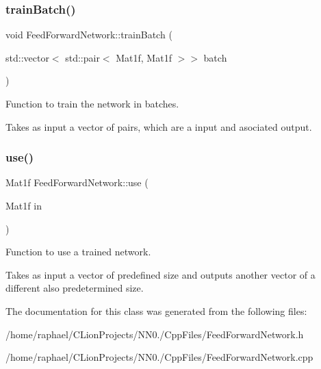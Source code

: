 \subsubsection{\texorpdfstring{train\+Batch()}{trainBatch()}}
{\footnotesize\ttfamily void Feed\+Forward\+Network\+::train\+Batch (\begin{DoxyParamCaption}\item[{std\+::vector$<$ std\+::pair$<$ Mat1f, Mat1f $>$$>$}]{batch }\end{DoxyParamCaption})}



Function to train the network in batches. 

Takes as input a vector of pairs, which are a input and asociated output. \mbox{\label{classFeedForwardNetwork_a17eb3563391ca5aecdff73d538e33f91}} 
\subsubsection{\texorpdfstring{use()}{use()}}
{\footnotesize\ttfamily Mat1f Feed\+Forward\+Network\+::use (\begin{DoxyParamCaption}\item[{Mat1f}]{in }\end{DoxyParamCaption})}



Function to use a trained network. 

Takes as input a vector of predefined size and outputs another vector of a different also predetermined size. 

The documentation for this class was generated from the following files\+:\begin{DoxyCompactItemize}
\item 
/home/raphael/\+C\+Lion\+Projects/\+N\+N0./\+Cpp\+Files/Feed\+Forward\+Network.\+h\item 
/home/raphael/\+C\+Lion\+Projects/\+N\+N0./\+Cpp\+Files/Feed\+Forward\+Network.\+cpp\end{DoxyCompactItemize}

